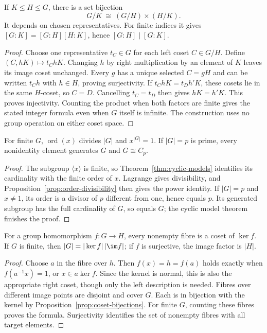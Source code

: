\begin{proposition}\label{prop:index-tower}
If $K\leq H\leq G$, there is a set bijection
\[
 G/K\ \cong\ (G/H)\times(H/K).
\]
It depends on chosen representatives. For finite indices it gives $[G:K]=[G:H][H:K]$, hence $[G:H]\mid[G:K]$.
\end{proposition}
\begin{proof}
Choose one representative $t_C\in G$ for each left coset $C\in G/H$. Define $(C,hK)\mapsto t_ChK$. Changing $h$ by right multiplication by an element of $K$ leaves its image coset unchanged. Every $g$ has a unique selected $C=gH$ and can be written $t_Ch$ with $h\in H$, proving surjectivity. If $t_ChK=t_Dh'K$, these cosets lie in the same $H$-coset, so $C=D$. Cancelling $t_C=t_D$ then gives $hK=h'K$. This proves injectivity. Counting the product when both factors are finite gives the stated integer formula even when $G$ itself is infinite. The construction uses no group operation on either coset space.
\end{proof}

\begin{corollary}\label{cor:finite-element-order}
For finite $G$, $\operatorname{ord}(x)$ divides $|G|$ and $x^{|G|}=1$. If $|G|=p$ is prime, every nonidentity element generates $G$ and $G\cong C_p$.
\end{corollary}
\begin{proof}
The subgroup $\langle x\rangle$ is finite, so Theorem~\ref{thm:cyclic-models} identifies its cardinality with the finite order of $x$. Lagrange gives divisibility, and Proposition~\ref{prop:order-divisibility} then gives the power identity. If $|G|=p$ and $x\ne1$, its order is a divisor of $p$ different from one, hence equals $p$. Its generated subgroup has the full cardinality of $G$, so equals $G$; the cyclic model theorem finishes the proof.
\end{proof}

\begin{proposition}\label{prop:hom-fibres}
For a group homomorphism $f:G\to H$, every nonempty fibre is a coset of $\ker f$. If $G$ is finite, then $|G|=|\ker f|\,|\im f|$; if $f$ is surjective, the image factor is $|H|$.
\end{proposition}
\begin{proof}
Choose $a$ in the fibre over $h$. Then $f(x)=h=f(a)$ holds exactly when $f(a^{-1}x)=1$, or $x\in a\ker f$. Since the kernel is normal, this is also the appropriate right coset, though only the left description is needed. Fibres over different image points are disjoint and cover $G$. Each is in bijection with the kernel by Proposition~\ref{prop:coset-bijections}. For finite $G$, counting these fibres proves the formula. Surjectivity identifies the set of nonempty fibres with all target elements.
\end{proof}

